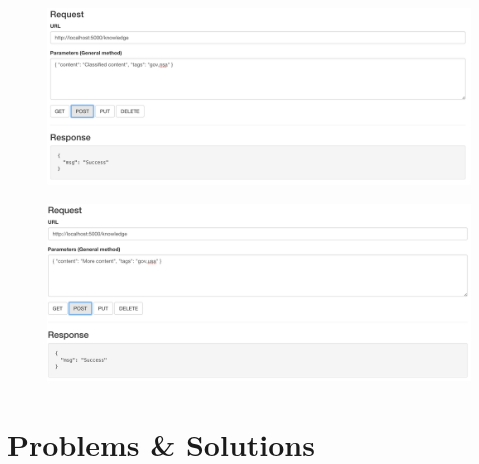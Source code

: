 \documentclass[11pt, a4paper]{article}
\begin{document}
\begin{figure}[h!]
  \includegraphics[width=\textwidth]{img/testput0}
\end{figure}

\begin{figure}[h!]
  \includegraphics[width=\textwidth]{img/testput1}
\end{figure}



\section{Problems \& Solutions}

\nocite{*}


\end{document}

